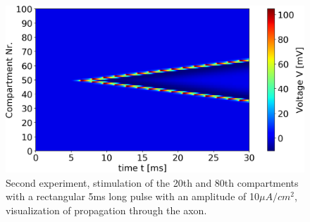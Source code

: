 \documentclass{scrartcl}			%
\begin{document}
\begin{figure}[hbpt!]					%
	 \begin{flushleft}
		\hspace*{-0.3in}
		\includegraphics[scale=0.53]{2.png}
		\captionsetup{width=\linewidth}  %
		\caption{Second experiment, stimulation of the 20th and 80th compartments with a rectangular 5ms long pulse with an amplitude of 10$\mu A/cm^2$, visualization of propagation through the axon.}		
		\label{fig2} %
	\end{flushleft}
\end{figure}
\end{document}
